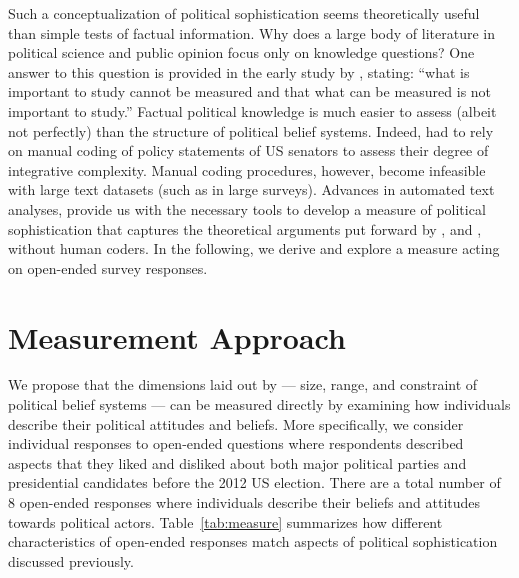 \documentclass[12pt]{article}
\begin{document}
Such a conceptualization of political sophistication seems theoretically useful than simple tests of factual information. Why does a large body of literature in political science and public opinion focus only on knowledge questions? One answer to this question is provided in the early study by \citet[206]{converse1964nature}, stating: ``what is important to study cannot be measured and that what can be measured is not important to study.'' Factual political knowledge is much easier to assess (albeit not perfectly) than the structure of political belief systems. Indeed, \citet{tetlock1983cognitive} had to rely on manual coding of policy statements of US senators to assess their degree of integrative complexity. Manual coding procedures, however, become infeasible with large text datasets (such as in large surveys). Advances in automated text analyses, provide us with the necessary tools to develop a measure of political sophistication that captures the theoretical arguments put forward by \citet{converse1964nature}, \citet{tetlock1983cognitive} and \citet{luskin1987measuring}, without human coders. In the following, we derive and explore a measure acting on open-ended survey responses.


\section{Measurement Approach}

We propose that the dimensions laid out by \citet{luskin1987measuring} --- size, range, and constraint of political belief systems --- can be measured directly by examining how individuals describe their political attitudes and beliefs. More specifically, we consider individual responses to open-ended questions where respondents described aspects that they liked and disliked about both major political parties and presidential candidates before the 2012 US election. There are a total number of 8 open-ended responses where individuals describe their beliefs and attitudes towards political actors. Table~\ref{tab:measure} summarizes how different characteristics of open-ended responses match aspects of political sophistication discussed previously.
\end{document}
